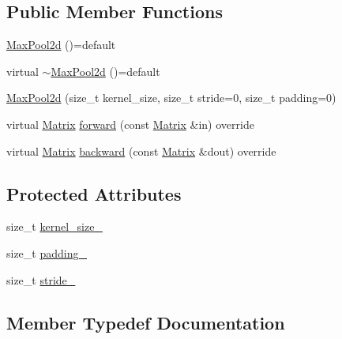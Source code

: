 \subsection*{Public Member Functions}
\begin{DoxyCompactItemize}
\item 
\mbox{\hyperlink{class_max_pool2d_adf1b59faff18335a4d8b7cdc9d9acad6}{Max\+Pool2d}} ()=default
\item 
virtual \mbox{\hyperlink{class_max_pool2d_a826785eceda78b54d150404ef24d23c3}{$\sim$\+Max\+Pool2d}} ()=default
\item 
\mbox{\hyperlink{class_max_pool2d_a5cfd5c6ae11f49fffb3d4a68f261f013}{Max\+Pool2d}} (size\+\_\+t kernel\+\_\+size, size\+\_\+t stride=0, size\+\_\+t padding=0)
\item 
virtual \mbox{\hyperlink{class_layer_a22b1e7286096aa62bd245536c8ebdaf1}{Matrix}} \mbox{\hyperlink{class_max_pool2d_a424de7878c64a058a8549362dae448f0}{forward}} (const \mbox{\hyperlink{class_layer_a22b1e7286096aa62bd245536c8ebdaf1}{Matrix}} \&in) override
\item 
virtual \mbox{\hyperlink{class_layer_a22b1e7286096aa62bd245536c8ebdaf1}{Matrix}} \mbox{\hyperlink{class_max_pool2d_a05cc96411753ff4c0c79a1543af9e795}{backward}} (const \mbox{\hyperlink{class_layer_a22b1e7286096aa62bd245536c8ebdaf1}{Matrix}} \&dout) override
\end{DoxyCompactItemize}
\subsection*{Protected Attributes}
\begin{DoxyCompactItemize}
\item 
size\+\_\+t \mbox{\hyperlink{class_max_pool2d_a665aa0f6561a8a7883d2746efeb68f88}{kernel\+\_\+size\+\_\+}}
\item 
size\+\_\+t \mbox{\hyperlink{class_max_pool2d_ab1dd4757718ee42e14bb7fdcf2a2be2c}{padding\+\_\+}}
\item 
size\+\_\+t \mbox{\hyperlink{class_max_pool2d_af8701b485ce94e4e3242a22e25350c80}{stride\+\_\+}}
\end{DoxyCompactItemize}


\subsection{Member Typedef Documentation}
\mbox{\label{class_max_pool2d_a8e701daf0dfb0e61e36eec865297a4e9}} 
